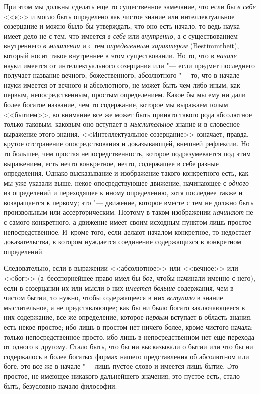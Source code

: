При этом мы должны сделать еще то существенное замечание, что если бы
{\em в себе} <<я>> и могло быть определено как чистое
знание или интеллектуальное созерцание и можно было бы утверждать, что оно
есть начало, то ведь наука имеет дело не с тем, что имеется
{\em в себе} или {\em внутренно}, а
с существованием внутреннего {\em в мышлении} и с тем
{\em определенным характером} (Bestimmtheit), который
носит такое внутреннее в этом существовании. Но то, что в
{\em начале} науки имеется от интеллектуального
созерцания или "--- если предмет последнего получает название вечного,
божественного, абсолютного "--- то, что в начале науки имеется от вечного и
абсолютного, не может быть чем-либо иным, как первым, непосредственным,
простым определением. Какое бы мы ему ни дали более богатое название, чем
то содержание, которое мы выражаем голым <<бытием>>, во внимание все же может
быть принято такого рода абсолютное только таковым, каковым оно вступает в
{\em мыслительное} знание и в словесное выражение этого
знания. <<Интеллектуальное созерцание>> означает, правда, крутое отстранение
опосредствования и доказывающей, внешней рефлексии. Но то большее, чем
простая непосредственность, которое подразумевается под этим выражением,
есть нечто конкретное, нечто, содержащее в себе разные определения. Однако
высказывание и изображение такого конкретного есть, как мы уже указали
выше, некое опосредствующее движение, начинающее с
{\em одного} из определений и переходящее к иному
определению, хотя последнее также и возвращается к первому; это "--- движение,
которое вместе с тем не должно быть произвольным или ассерторическим.
Поэтому в таком изображении {\em начинают} не с самого
конкретного, а движение имеет своим исходным пунктом лишь простое
непосредственное. И~кроме того, если делают началом конкретное, то
недостает доказательства, в котором нуждается соединение содержащихся в
конкретном определений.

Следовательно, если в выражении <<абсолютное>> или <<вечное>> или <<бог>>
(а~бесспорнейшее право имел бы {\em бог}, чтобы начинали
именно с него), если в созерцании их или мысли о них
{\em имеется больше} содержания, чем в чистом бытии, то
нужно, чтобы содержащееся в них {\em вступило} в знание
мыслительное, а не представляющее; как бы ни было богато заключающееся в
них содержание, все же определение, которое
{\em первым} вступает в область знания, есть некое
простое; ибо лишь в простом нет ничего более, кроме чистого начала; только
непосредственное просто, ибо лишь в непосредственном нет еще перехода от
одного к другому. Стало быть, что бы ни высказывали о бытии или что бы ни
содержалось в более богатых формах нашего представления об абсолютном или
боге, это все же в начале "--- лишь пустое слово и имеется лишь бытие. Это
простое, не имеющее никакого дальнейшего значения, это пустое есть, стало
быть, безусловно начало философии.

